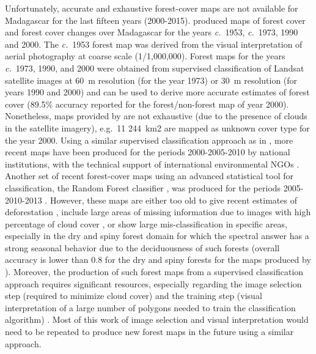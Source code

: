 \documentclass[essd, classical]{copernicus}
\begin{document}
Unfortunately, accurate and exhaustive forest-cover maps are not
available for Madagascar for the last fifteen years (2000-2015).
\citet{Harper2007} produced maps of forest cover and forest cover
changes over Madagascar for the years \emph{c.}~1953, \emph{c.}~1973,
1990 and 2000. The \emph{c.}~1953 forest map was derived from the
visual interpretation of aerial photography at coarse scale
(1/1,000,000). Forest maps for the years \emph{c.}~1973, 1990, and
2000 were obtained from supervised classification of Landsat satellite
images at 60~m resolution (for the year 1973) or 30~m resolution (for
years 1990 and 2000) and can be used to derive more accurate estimates
of forest cover (89.5\% accuracy reported for the forest/non-forest
map of year 2000). Nonetheless, maps provided by \citet{Harper2007}
are not exhaustive (due to the presence of clouds in the satellite
imagery), e.g.~11 244~km2 are mapped as unknown cover type for the
year 2000. Using a similar supervised classification approach as in
\citet{Harper2007}, more recent maps have been produced for the
periods 2000-2005-2010 by national institutions, with the technical
support of international environmental NGOs \citep{MEFT2009,
  ONE2013}. Another set of recent forest-cover maps using an advanced
statistical tool for classification, the Random Forest classifier
\citep{Grinand2013, Rakotomalala2015}, was produced for the periods
2005-2010-2013 \citep{ONE2015}. However, these maps are either too old
to give recent estimates of deforestation \citep{MEFT2009, ONE2013},
include large areas of missing information due to images with high
percentage of cloud cover \citep{ONE2013}, or show large
mis-classification in specific areas, especially in the dry and spiny
forest domain for which the spectral answer has a strong seasonal
behavior due to the deciduousness of such forests (overall accuracy is
lower than 0.8 for the dry and spiny forests for the maps produced by
\citet{ONE2015}). Moreover, the production of such forest maps from a
supervised classification approach requires significant resources,
especially regarding the image selection step (required to minimize
cloud cover) and the training step (visual interpretation of a large
number of polygons needed to train the classification algorithm)
\citep{Rakotomalala2015}. Most of this work of image selection and
visual interpretation would need to be repeated to produce new forest
maps in the future using a similar approach.
\end{document}
